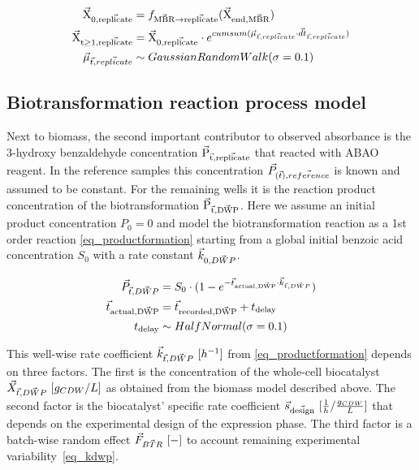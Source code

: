 \documentclass[sn-standardnature]{sn-jnl}%
\def\vec{\mathaccent "017E\relax }
\theoremstyle{thmstyleone}%
\theoremstyle{thmstyletwo}%
\theoremstyle{thmstylethree}%
\begin{document}
\begin{equation}
\begin{aligned}
    \mathrm{\vec{X}_{0,\vec{replicate}}} &= f_\mathrm{\vec{MBR}\rightarrow \vec{replicate}}(\mathrm{\vec{X}_{end,\vec{MBR}}}) \\
    \mathrm{\vec{X}_{t \ge 1,\vec{replicate}}} &= \mathrm{\vec{X}_{0,\vec{replicate}}} \cdot e^{cumsum(\vec{\mu}_{\vec{t},\vec{replicate}} \cdot \vec{dt}_{\vec{t},\vec{replicate}})}\\
    \vec{\mu}_{\vec{t},\vec{replicate}} &\sim GaussianRandomWalk(\sigma=0.1) \\
\end{aligned}
\label{eq_Xrandomwalk}
\end{equation}


\subsection{Biotransformation reaction process model}
\label{sec_product_model}

Next to biomass, the second important contributor to observed absorbance is the 3-hydroxy benzaldehyde concentration $\mathrm{\vec{P}_{\vec{t},\vec{replicate}}}$ that reacted with ABAO reagent.
In the reference samples this concentration $\vec{P}_{(\vec{t}),\vec{reference}}$ is known and assumed to be constant.
For the remaining wells it is the reaction product concentration of the biotransformation $\mathrm{\vec{P}_{\vec{t},\vec{DWP}}}$.
Here we assume an initial product concentration $P_0=0$ and model the biotransformation reaction as a 1st order reaction \eqref{eq_productformation} starting from a global initial benzoic acid concentration $S_0$ with a rate constant $\vec{k}_{0,\vec{DWP}}$.

\begin{equation}
\begin{aligned}
    \vec{P}_{\vec{t},\vec{DWP}} &= S_0 \cdot (1 - e^{-\vec{t}_\mathrm{actual,\vec{DWP}} \cdot \vec{k}_{\vec{t},\vec{DWP}}}) \\
    \vec{t}_\mathrm{actual,\vec{DWP}} &= \vec{t}_\mathrm{recorded,\vec{DWP}} + t_\mathrm{delay} \\
    t_\mathrm{delay} &\sim HalfNormal(\sigma = 0.1)
\end{aligned}
\label{eq_productformation}
\end{equation}

This well-wise rate coefficient $\vec{k}_{\vec{t},\vec{DWP}}\ [h^{-1}]$ from \eqref{eq_productformation} depends on three factors.
The first is the concentration of the whole-cell biocatalyst $\vec{X}_{\vec{t},\vec{DWP}}\ [g_{CDW}/L]$ as obtained from the biomass model described above.
The second factor is the biocatalyst' specific rate coefficient $\vec{s}_\mathrm{\vec{design}}\ [\frac{1}{h} / \frac{g_{CDW}}{L}]$ that depends on the experimental design of the expression phase.
The third factor is a batch-wise random effect $\vec{F}_{\vec{BTR}}\ [-]$ to account remaining experimental variability~\eqref{eq_kdwp}.
\end{document}
